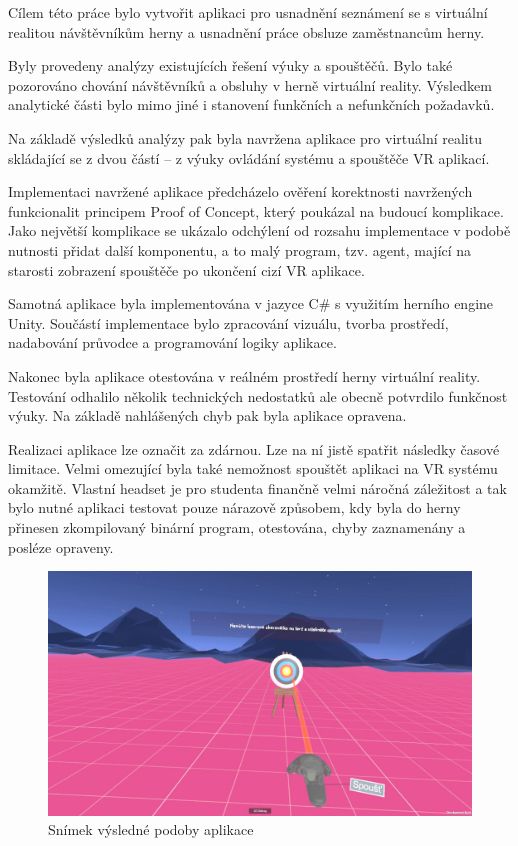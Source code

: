 Cílem této práce bylo vytvořit aplikaci pro usnadnění seznámení se s
virtuální realitou návštěvníkům herny a usnadnění práce obsluze zaměstnancům herny.

Byly provedeny analýzy existujících řešení výuky a spouštěčů. Bylo také
pozorováno chování návštěvníků a obsluhy v herně virtuální reality.
Výsledkem analytické části bylo mimo jiné i stanovení funkčních a
nefunkčních požadavků.

Na základě výsledků analýzy pak byla navržena aplikace pro virtuální
realitu skládající se z dvou částí -- z výuky ovládání systému a
spouštěče VR aplikací.

Implementaci navržené aplikace předcházelo ověření korektnosti
navržených funkcionalit principem Proof of Concept, který poukázal na
budoucí komplikace. Jako největší komplikace se ukázalo odchýlení od
rozsahu implementace v podobě nutnosti přidat další komponentu, a to
malý program, tzv. agent, mající na starosti zobrazení spouštěče po
ukončení cizí VR aplikace.

Samotná aplikace byla implementována v jazyce C\# s využitím herního
engine Unity. Součástí implementace bylo zpracování vizuálu, tvorba
prostředí, nadabování průvodce a programování logiky aplikace.

Nakonec byla aplikace otestována v reálném prostředí herny virtuální
reality. Testování odhalilo několik technických nedostatků ale obecně
potvrdilo funkčnost výuky. Na základě nahlášených chyb pak byla aplikace
opravena.

Realizaci aplikace lze označit za zdárnou. Lze na ní jistě spatřit
následky časové limitace. Velmi omezující byla také nemožnost spouštět
aplikaci na VR systému okamžitě. Vlastní headset je pro studenta
finančně velmi náročná záležitost a tak bylo nutné aplikaci testovat
pouze nárazově způsobem, kdy byla do herny přinesen zkompilovaný
binární program, otestována, chyby zaznamenány a posléze opraveny.

\begin{figure}[h!]
\centering
\includegraphics[width=12cm]{src/assets/result.png}
\caption{Snímek výsledné podoby aplikace}
\end{figure}

